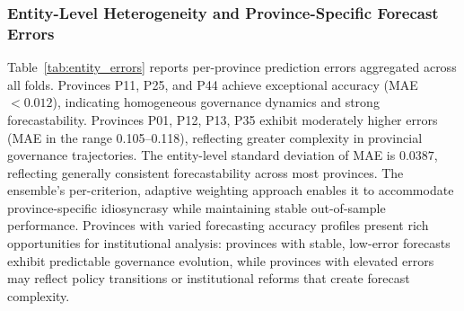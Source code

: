\documentclass[12pt,a4paper]{article}
\begin{document}
\FloatBarrier

\subsubsection*{Entity-Level Heterogeneity and Province-Specific Forecast Errors}

Table~\ref{tab:entity_errors} reports per-province prediction errors aggregated across all folds. Provinces P11, P25, and P44 achieve exceptional accuracy (MAE $< 0.012$), indicating homogeneous governance dynamics and strong forecastability. Provinces P01, P12, P13, P35 exhibit moderately higher errors (MAE in the range 0.105--0.118), reflecting greater complexity in provincial governance trajectories. The entity-level standard deviation of MAE is $0.0387$, reflecting generally consistent forecastability across most provinces. The ensemble's per-criterion, adaptive weighting approach enables it to accommodate province-specific idiosyncrasy while maintaining stable out-of-sample performance. Provinces with varied forecasting accuracy profiles present rich opportunities for institutional analysis: provinces with stable, low-error forecasts exhibit predictable governance evolution, while provinces with elevated errors may reflect policy transitions or institutional reforms that create forecast complexity.
\end{document}
